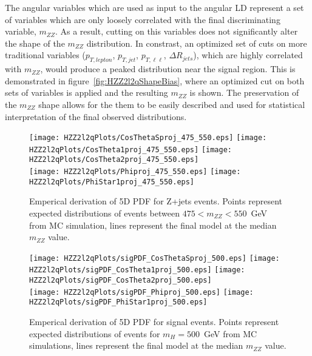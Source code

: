 The angular variables which are used as input to the angular LD represent 
a set of variables which are only loosely correlated with the final discriminating 
variable, $m_{ZZ}$.  As a result, cutting on this variables does not significantly
alter the shape of the $m_{ZZ}$ distribution.  In constrast, an optimized set of 
cuts on more traditional variables ($p_{T,lepton}$, $p_{T,jet}$, $p_{T,\ell\ell}$, 
$\Delta R_{jets}$), which are highly correlated with $m_{ZZ}$, 
would produce a peaked distribution near the signal region.  This is demonstrated
in figure~\ref{fig:HZZ2l2qShapeBias}, where an optimized cut on both sets of 
variables is applied and the resulting $m_{ZZ}$ is shown.  The preservation of
the $m_{ZZ}$ shape allows for the them to be easily described and used
for statistical interpretation of the final observed distributions.  

\begin{figure}
\begin{center}
\texttt{[image: HZZ2l2qPlots/CosThetaSproj\_475\_550.eps]}  
\texttt{[image: HZZ2l2qPlots/CosTheta1proj\_475\_550.eps]}  
\texttt{[image: HZZ2l2qPlots/CosTheta2proj\_475\_550.eps]}\\
\texttt{[image: HZZ2l2qPlots/Phiproj\_475\_550.eps]}        
\texttt{[image: HZZ2l2qPlots/PhiStar1proj\_475\_550.eps]}   
\caption{ Emperical derivation of 5D PDF for Z+jets events.  Points
represent expected distributions of events between $475<m_{ZZ}<550$~GeV from MC simulation, lines represent the final model at the 
median $m_{ZZ}$ value.}
\label{fig:HZZ2l2qBackgroundPDF}
\end{center}
\end{figure}

\begin{figure}
\begin{center}
\texttt{[image: HZZ2l2qPlots/sigPDF\_CosThetaSproj\_500.eps]}  
\texttt{[image: HZZ2l2qPlots/sigPDF\_CosTheta1proj\_500.eps]}  
\texttt{[image: HZZ2l2qPlots/sigPDF\_CosTheta2proj\_500.eps]}\\
\texttt{[image: HZZ2l2qPlots/sigPDF\_Phiproj\_500.eps]}        
\texttt{[image: HZZ2l2qPlots/sigPDF\_PhiStar1proj\_500.eps]}   
\caption{ Emperical derivation of 5D PDF for signal events.  Points
represent expected distributions of events for $m_H=500$~GeV from MC
simulations, lines represent the final model at the 
median $m_{ZZ}$ value. }
\label{fig:HZZ2l2qSignalPDF}
\end{center}
\end{figure}

